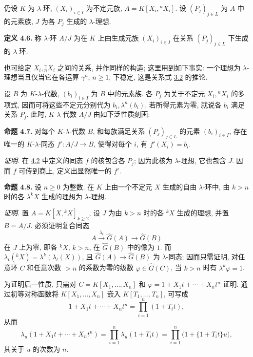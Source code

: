 仍设 \(K\) 为 \(\lambda\)-环, \((X_i)_{i\in I}\) 为不定元族, \(A=K[X_i,{}^nX_i]\). 设 \((P_j)_{j\in L}\) 为 \(A\) 中的元素族, \(J\) 为各 \(P_j\) 生成的 \(\lambda\)-理想.

\textbf{定义 4.6.} 称 \(\lambda\)-环 \(A/J\) 为在 \(K\) 上由生成元族 \((X_i)_{i\in I}\) 在关系 \((P_j)_{j\in L}\) 下生成的 \(\lambda\)-环.

也可给定 \(X_i,{}^\gamma_nX_i\) 之间的关系, 并作同样的构造; 这里用到如下事实: 一个理想为 \(\lambda\)-理想当且仅当它在各运算 \(\gamma^n\), \(n\ge1\), 下稳定, 这是关系式 \hyperlink{sga6.e05.prop.3-2}{3.2} 的推论.

设 \(B\) 为 \(K\)-\(\lambda\)-代数, \((b_i)_{i\in I}\) 为 \(B\) 中的元素族. 各 \(P_j\) 为关于不定元 \(X_i,{}^nX_i\) 的多项式, 因而可将这些不定元分别代为 \(b_i,\lambda^n(b_i)\). 若所得元素为零, 就说各 \(b_i\) 满足关系 \(P_j\). 此时, \(K\)-\(\lambda\)-代数 \(A/J\) 由如下泛性质刻画:

\textbf{命题 4.7.} 对每个 \(K\)-\(\lambda\)-代数 \(B\), 和每族满足关系 \((P_j)_{j\in L}\) 的元素 \((b_i)_{i\in I}\), 存在唯一的 \(K\)-\(\lambda\)-同态 \(f':A/J\to B\), 使得对每个 \(i\), 有 \(f'(X_i)=b_i\).

\emph{证明.} 在 \hyperlink{sga6.e05.prop.4-2}{4.2} 中定义的同态 \(f\) 的核包含各 \(P_j\); 因为此核为 \(\lambda\)-理想, 它也包含 \(J\). 因而 \(f\) 可传到商上, 定义出显然唯一的 \(f'\).

\textbf{命题 4.8.} 设 \(n\ge0\) 为整数. 在 \(K\) 上由一个不定元 \(X\) 生成的自由 \(\lambda\)-环中, 由 \(k>n\) 时的各 \(\lambda^kX\) 生成的理想为 \(\lambda\)-理想.

\emph{证明.} 置 \(A=K[X,{}^kX]_{k\ge2}\), 设 \(J\) 为由 \(k>n\) 时的各 \({}^kX\) 生成的理想, 并置 \(B=A/J\). 必须证明复合同态
\[
 A\xrightarrow{\lambda_t}\widehat G(A)\longrightarrow\widehat G(B)
\]
在 \(J\) 上为零, 即各 \({}^kX\), \(k>n\), 在 \(\widehat G(B)\) 中的像为 \(1\). 而 \(\lambda_t({}^kX)=\lambda^k(\lambda_t(X))\), 且 \(\widehat G(A)\to\widehat G(B)\) 为 \(\lambda\)-同态; 因而只需证明, 对任意环 \(C\) 和任意次数 \(>n\) 的系数为零的级数 \(\varphi\in\widehat G(C)\), 当 \(k>n\) 时有 \(\lambda^k\varphi=1\).

为证明后一性质, 只需对 \(C=K[X_1,\ldots,X_n]\) 和 \(\varphi=1+X_1t+\cdots+X_nt^n\) 证明. 通过初等对称函数将 \(K[X_1,\ldots,X_n]\) 嵌入 \(K[T_1,\ldots,T_n]\), 可写成
\[
 1+X_1t+\cdots+X_nt^n=\prod_{i=1}^n(1+T_it),
\]
从而
\[
 \lambda_u(1+X_1t+\cdots+X_nt^n)
 =\prod_{i=1}^n\lambda_u(1+T_it)
 =\prod_{i=1}^n\bigl(1+\{1+T_it\}u\bigr),
\]
其关于 \(u\) 的次数为 \(n\).

